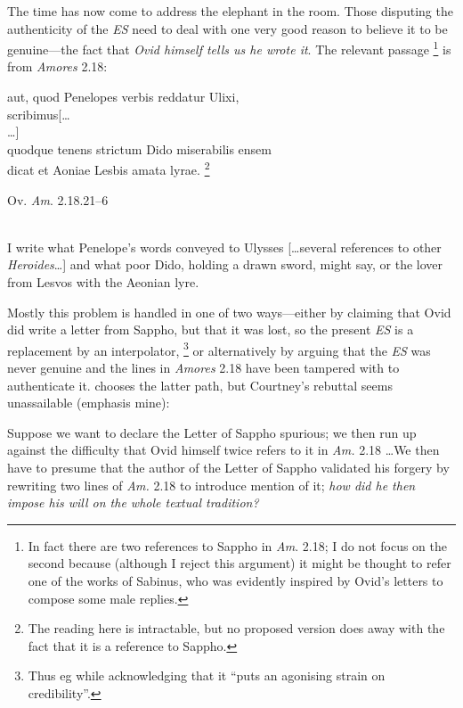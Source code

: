 \documentclass[twocolumn, switch, a4paper]{article} %
\begin{document}
The time has now come to address the elephant in the room. Those disputing the
authenticity of the \emph{ES} need to deal with one very good reason to
believe it to be genuine---the fact that \emph{Ovid himself tells us he wrote
it}. The relevant passage%
%
    \footnote{In fact there are two references to Sappho in \emph{Am}. 2.18; I
    do not focus on the second because (although I reject this argument) it
    might be thought to refer one of the works of Sabinus, who was evidently
    inspired by Ovid's letters to compose some male replies.}
%
is from \emph{Amores} 2.18:
\begin{adjustwidth}{0.07\linewidth}{0.07\linewidth}
  \footnotesize
  \smallskip
  \begin{onehalfspace}
    aut, quod Penelopes verbis reddatur Ulixi,\\
    \phantom{xx} scribimus[\dots\\
    \dots]\\
    quodque tenens strictum Dido miserabilis ensem\\
    \phantom{xx} dicat et \dag Aoniae Lesbis amata lyrae\dag.%
    \footnote{The reading here is intractable, but no proposed version does
    away with the fact that it is a reference to Sappho.}
    \begin{flushright}
      Ov. \emph{Am}. 2.18.21--6
    \end{flushright}
  \end{onehalfspace}
  \phantom{xx}\\
  I write what Penelope's words conveyed to Ulysses [\dots several
  references to other \emph{Heroides}\dots] and what poor Dido, holding
  a drawn sword, might say, or the lover from Lesvos with the Aeonian lyre.
\end{adjustwidth}
Mostly this problem is handled in one of two ways---either by claiming that
Ovid did write a letter from Sappho, but that it was lost, so the present
\emph{ES} is a replacement by an interpolator,%
%
    \footnote{Thus eg  while acknowledging that it
    ``puts an agonising strain on credibility''.}
%
or alternatively by arguing that the \emph{ES} was never genuine and the lines
in \emph{Amores} 2.18 have been tampered with to authenticate it.
 chooses the latter path, but Courtney's
\citeyear[163]{courtney_97} rebuttal seems unassailable (emphasis mine):

\begin{adjustwidth}{0.07\linewidth}{0.07\linewidth}
\footnotesize%
 Suppose we want to declare the Letter of Sappho spurious; we then run up
 against the difficulty that Ovid himself twice refers to it in \emph{Am.} 2.18
 \dots We then have to presume that the author of the Letter of Sappho
 validated his forgery by rewriting two lines of \emph{Am.} 2.18 to introduce
 mention of it; \emph{how did he then impose his will on the whole textual
 tradition?}
\end{adjustwidth}
\end{document}
